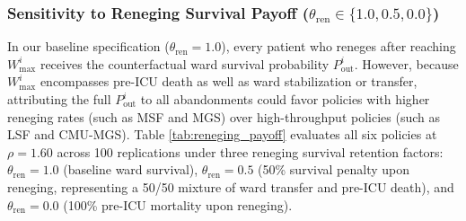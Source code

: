 \documentclass[final,5p,times,twocolumn]{elsarticle}
\begin{document}
\subsubsection{Sensitivity to Reneging Survival Payoff ($\theta_{\text{ren}} \in \{1.0, 0.5, 0.0\}$)}
\label{sec:reneging_sensitivity}
In our baseline specification ($\theta_{\text{ren}} = 1.0$), every patient who reneges after reaching $W_{\max}^i$ receives the counterfactual ward survival probability $P_{\text{out}}^i$. However, because $W_{\max}^i$ encompasses pre-ICU death as well as ward stabilization or transfer, attributing the full $P_{\text{out}}^i$ to all abandonments could favor policies with higher reneging rates (such as MSF and MGS) over high-throughput policies (such as LSF and CMU-MGS). Table \ref{tab:reneging_payoff} evaluates all six policies at $\rho = 1.60$ across 100 replications under three reneging survival retention factors: $\theta_{\text{ren}} = 1.0$ (baseline ward survival), $\theta_{\text{ren}} = 0.5$ (50\% survival penalty upon reneging, representing a 50/50 mixture of ward transfer and pre-ICU death), and $\theta_{\text{ren}} = 0.0$ (100\% pre-ICU mortality upon reneging).
\end{document}
